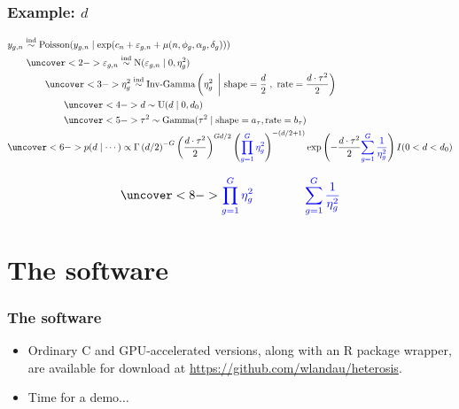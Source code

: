 \documentclass[handout]{beamer}
\providecommand{\e}{\varepsilon}
\numberwithin{equation}{section}
\begin{document}
\begin{frame}
\frametitle{Example: $d$} \tiny
\begin{align*}
&y_{g,n} \stackrel{\text{ind}}{\sim} \text{Poisson}(y_{g, n} \mid \exp(c_n + \e_{g, n} + \mu(n, \phi_g, \alpha_g, \delta_g))) \\
& \qquad \uncover<2->{ \e_{g, n} \stackrel{\text{ind}}{\sim} \text{N}(\e_{g, n} \mid 0, \eta_g^2)} \\
& \qquad \qquad \uncover<3->{\eta_g^2 \stackrel{\text{ind}}{\sim} \text{Inv-Gamma}\left (\eta_g^2 \ \left | \ \text{shape} = \frac{d}{2} \right ., \ \text{rate} =  \frac{d \cdot \tau^2}{2} \right)} \\
& \qquad \qquad \qquad \uncover<4->{d \stackrel{\text{}}{\sim} \text{U}(d \mid 0, d_0)} \\
& \qquad \qquad \qquad \uncover<5->{\tau^2 \stackrel{\text{}}{\sim} \text{Gamma}(\tau^2 \mid \text{shape} = a_\tau, \text{rate} = b_\tau)} \\
&\uncover<6->{p(d \mid \cdots) \propto \Gamma \left( d/2 \right )^{-G} \left ( \frac{d \cdot \tau^2}{2}\right ) ^ { G d  /2 } \left ({\color{blue} \prod_{g = 1}^G { \eta_g^2} } \right )^{ -(d/2 + 1)} \exp \left (- \frac{d \cdot \tau^2}{2} {\color{blue} \sum_{g = 1}^G \frac{1}{ \eta_g^2} }\right ) I(0 < d < d_0) }
\end{align*}



\small
\begin{itemize}
\begin{align*}
\uncover<8->{\color{blue}\prod_{g = 1}^G \eta_g^2 \qquad \qquad \sum_{g = 1}^G \frac{1}{\eta_g^2} } 
\end{align*}
\end{itemize}
\end{frame}






\section{The software}

\begin{frame}
\frametitle{The software}
\begin{itemize}
\item Ordinary C and GPU-accelerated versions, along with an R package wrapper, are available for download at \url{https://github.com/wlandau/heterosis}.
\pause \item Time for a demo$\ldots$
\end{itemize}

\end{frame}
\end{document}
